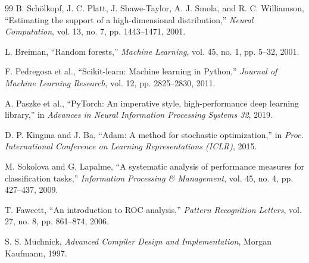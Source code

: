 \documentclass[12pt,a4paper]{article}
\begin{document}
\begin{thebibliography}{99}
B. Sch\"olkopf, J. C. Platt, J. Shawe-Taylor, A. J. Smola, and R. C. Williamson,
``Estimating the support of a high-dimensional distribution,''
\textit{Neural Computation}, vol. 13, no. 7, pp. 1443--1471, 2001.

L. Breiman,
``Random forests,''
\textit{Machine Learning}, vol. 45, no. 1, pp. 5--32, 2001.

F. Pedregosa et al.,
``Scikit-learn: Machine learning in Python,''
\textit{Journal of Machine Learning Research}, vol. 12, pp. 2825--2830, 2011.

A. Paszke et al.,
``PyTorch: An imperative style, high-performance deep learning library,''
in \textit{Advances in Neural Information Processing Systems 32}, 2019.

D. P. Kingma and J. Ba,
``Adam: A method for stochastic optimization,''
in \textit{Proc. International Conference on Learning Representations (ICLR)}, 2015.

M. Sokolova and G. Lapalme,
``A systematic analysis of performance measures for classification tasks,''
\textit{Information Processing \& Management}, vol. 45, no. 4, pp. 427--437, 2009.

T. Fawcett,
``An introduction to ROC analysis,''
\textit{Pattern Recognition Letters}, vol. 27, no. 8, pp. 861--874, 2006.

S. S. Muchnick,
\textit{Advanced Compiler Design and Implementation},
Morgan Kaufmann, 1997.

\end{thebibliography}
\end{document}
